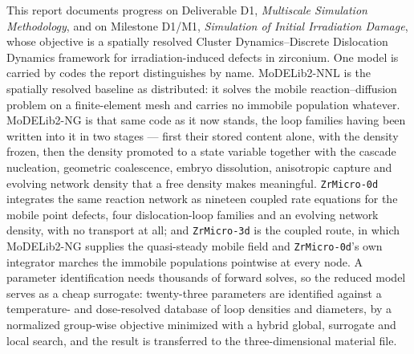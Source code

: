 \documentclass{article}
\newcommand{\ZrM}{\texttt{ZrMicro-3d}}
\newcommand{\MoD}{\textsf{MoDELib2-NNL}}
\newcommand{\ZrOd}{\texttt{ZrMicro-0d}}
\newcommand{\MoDNG}{\textsf{MoDELib2-NG}}
\begin{document}
This report documents progress on Deliverable D1, \emph{Multiscale Simulation
Methodology}, and on Milestone D1/M1, \emph{Simulation of Initial
Irradiation Damage}, whose objective is a spatially resolved Cluster
Dynamics--Discrete Dislocation Dynamics framework for irradiation-induced defects
in zirconium. One model is carried by codes the report distinguishes by name.
{\MoD} is the spatially resolved baseline as distributed: it solves the mobile
reaction--diffusion problem on a finite-element mesh and carries no immobile
population whatever. {\MoDNG} is that same code as it now stands, the loop
families having been written into it in two stages --- first their stored content
alone, with the density frozen, then the density promoted to a state variable
together with the cascade nucleation, geometric coalescence, embryo dissolution,
anisotropic capture and evolving network density that a free density makes
meaningful. {\ZrOd} integrates the same reaction network as nineteen coupled rate
equations for the mobile point defects, four dislocation-loop families and an
evolving network density, with no transport at all; and {\ZrM} is the coupled
route, in which {\MoDNG} supplies the quasi-steady mobile field and {\ZrOd}'s own
integrator marches the immobile populations pointwise at every node. A parameter
identification needs thousands of forward solves, so the reduced model serves as a
cheap surrogate: twenty-three parameters are identified against a temperature- and
dose-resolved database of loop densities and diameters, by a normalized
group-wise objective minimized with a hybrid global, surrogate and local search,
and the result is transferred to the three-dimensional material file.
\end{document}
